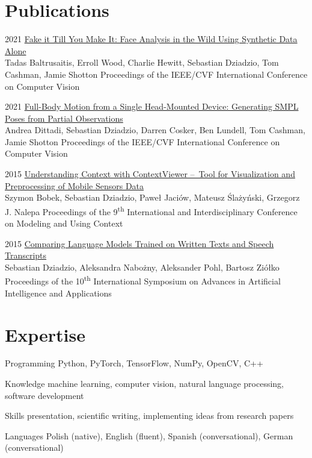 \documentclass[]{friggeri-cv_osx}
\begin{document}
\section{Publications}
\begin{entrylist}
\entry
{2021}
{\href{https://scholar.google.com/citations?user=8vAIQXoAAAAJ&hl=en}{Fake it Till You Make It: Face Analysis in the Wild Using Synthetic Data Alone\\}}
{Tadas Baltrusaitis, Erroll Wood, Charlie Hewitt, Sebastian Dziadzio, Tom Cashman, Jamie Shotton}
{Proceedings of the IEEE/CVF International Conference on Computer Vision\\}

\entry
{2021}
{\href{https://scholar.google.com/citations?user=8vAIQXoAAAAJ&hl=en}{Full-Body Motion from a Single Head-Mounted Device: Generating SMPL Poses from Partial Observations\\}}
{Andrea Dittadi, Sebastian Dziadzio, Darren Cosker, Ben Lundell, Tom Cashman, Jamie Shotton}
{Proceedings of the IEEE/CVF International Conference on Computer Vision\\}

\entry
{2015}
{\href{https://scholar.google.com/citations?user=8vAIQXoAAAAJ&hl=en}{Understanding Context with ContextViewer – Tool for Visualization and Preprocessing of Mobile Sensors Data\\}}
{Szymon Bobek, Sebastian Dziadzio, Paweł Jaciów, Mateusz Ślażyński, Grzegorz J. Nalepa}
{Proceedings of the 9\textsuperscript{th} International and Interdisciplinary Conference on Modeling and Using Context\\}

\entry
{2015}
{\href{https://scholar.google.com/citations?user=8vAIQXoAAAAJ&hl=en}{Comparing Language Models Trained on Written Texts and Speech Transcripts\\}}
{Sebastian Dziadzio, Aleksandra Nabożny, Aleksander Pohl, Bartosz Ziółko}
{Proceedings of the 10\textsuperscript{th} International Symposium on Advances in Artificial Intelligence and Applications\\}
\end{entrylist}

\section{Expertise}
\begin{entrylist}
\entry
{}
{Programming}
{}
{Python, PyTorch, TensorFlow, NumPy, OpenCV, C++}

\entry
{}
{Knowledge}
{}
{machine learning, computer vision, natural language processing, software development}

\entry
{}
{Skills}
{}
{presentation, scientific writing, implementing ideas from research papers}

\entry
{}
{Languages}
{}
{Polish (native), English (fluent), Spanish (conversational), German (conversational)}
\end{entrylist}
\end{document}
